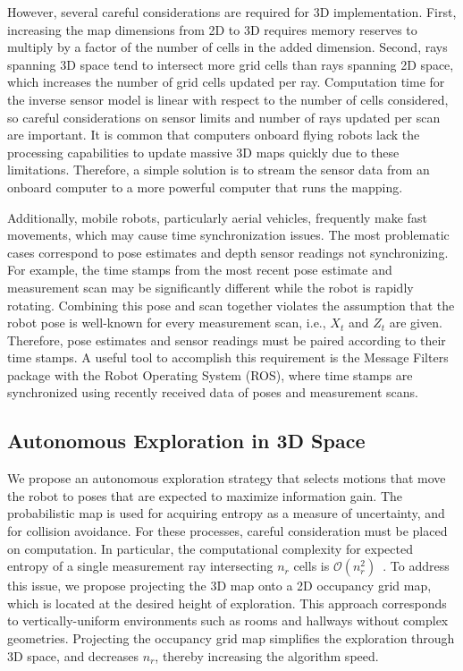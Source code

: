 \documentclass[smallextended]{svjour3}       %
\begin{document}
However, several careful considerations are required for 3D implementation. First, increasing the map dimensions from 2D to 3D requires memory reserves to multiply by a factor of the number of cells in the added dimension. Second, rays spanning 3D space tend to intersect more grid cells than rays spanning 2D space, which increases the number of grid cells updated per ray. Computation time for the inverse sensor model is linear with respect to the number of cells considered, so careful considerations on sensor limits and number of rays updated per scan are important.
It is common that computers onboard flying robots lack the processing capabilities to update massive 3D maps quickly due to these limitations. Therefore, a simple solution is to stream the sensor data from an onboard computer to a more powerful computer that runs the mapping.

Additionally, mobile robots, particularly aerial vehicles, frequently make fast movements, which may cause time synchronization issues. The most problematic cases correspond to pose estimates and depth sensor readings not synchronizing. For example, the time stamps from the most recent pose estimate and measurement scan may be significantly different while the robot is rapidly rotating. Combining this pose and scan together violates the assumption that the robot pose is well-known for every measurement scan, i.e., $X_t$ and $Z_t$ are given. Therefore, pose estimates and sensor readings must be paired according to their time stamps. A useful tool to accomplish this requirement is the Message Filters package with the Robot Operating System (ROS), where time stamps are synchronized using recently received data of poses and measurement scans.

\subsection{Autonomous Exploration in 3D Space}

We propose an autonomous exploration strategy that selects motions that move the robot to poses that are expected to maximize information gain. The probabilistic map is used for acquiring entropy as a measure of uncertainty, and for collision avoidance. For these processes, careful consideration must be placed on computation. In particular, the computational complexity for expected entropy of a single measurement ray intersecting $n_r$ cells is $\mathcal O(n_r^2)$~\cite{KauAiLee16}. To address this issue, we propose projecting the 3D map onto a 2D occupancy grid map, which is located at the desired height of exploration. This approach corresponds to vertically-uniform environments such as rooms and hallways without complex geometries. Projecting the occupancy grid map simplifies the exploration through 3D space, and decreases $n_r$, thereby increasing the algorithm speed.
\end{document}
